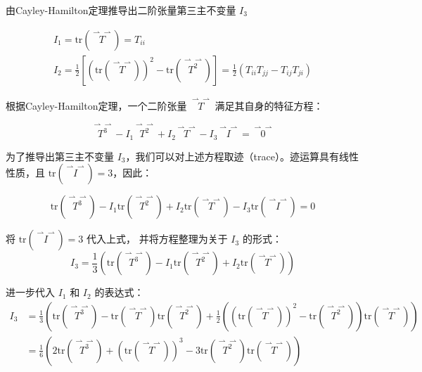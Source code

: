 \documentclass[12pt, a4paper, oneside, UTF8]{ctexbook}  %
\newcommand{\vvec}{\overset{\rightharpoonup\!\!\!\! \rightharpoonup}}
\begin{document}
\begin{example}
由Cayley-Hamilton定理推导出二阶张量第三主不变量 \(I_3\)
\begin{yzh}
\begin{gather*}  
        I_1 = \text{tr}(\vvec{T}) = T_{ii}\\
        I_2 = \frac{1}{2} \left[ (\text{tr}(\vvec{T}))^2 - \text{tr}(\vvec{T^2}) \right] = \frac{1}{2} \left( T_{ii} T_{jj} - T_{ij} T_{ji} \right)
\end{gather*} 
\end{yzh}
\begin{tui}
根据Cayley-Hamilton定理，一个二阶张量 \(\vvec{T}\) 满足其自身的特征方程：

\[
\vvec{T^3} - I_1 \vvec{T^2} + I_2 \vvec{T} - I_3 \vvec{I} = \vvec{0}
\]

为了推导出第三主不变量 \(I_3\)，我们可以对上述方程取迹（trace）。迹运算具有线性性质，且 \(\text{tr}(\vvec{I}) = 3\)，因此：

\[
\text{tr}(\vvec{T^3}) - I_1 \text{tr}(\vvec{T^2}) + I_2 \text{tr}(\vvec{T}) - I_3 \text{tr}(\vvec{I}) = 0
\]

将 \(\text{tr}(\vvec{I}) = 3\) 代入上式，
并将方程整理为关于 \(I_3\) 的形式：
\[
I_3 = \frac{1}{3} \left( \text{tr}(\vvec{T^3}) - I_1 \text{tr}(\vvec{T^2}) + I_2 \text{tr}(\vvec{T}) \right)
\]

进一步代入 \(I_1\) 和 \(I_2\) 的表达式：
\begin{align*}
I_3 &= \frac{1}{3} \left( \text{tr}(\vvec{T^3}) - \text{tr}(\vvec{T}) \text{tr}(\vvec{T^2}) 
+ \frac{1}{2} \left( (\text{tr}(\vvec{T}))^2 - \text{tr}(\vvec{T^2}) \right) \text{tr}(\vvec{T}) \right)\\
 &= \frac{1}{6}\left(2\text{tr}(\vvec{T^3})+(\text{tr}(\vvec{T}))^3
 -3\text{tr}(\vvec{T^2})\text{tr}(\vvec{T})\right)  
\end{align*}
\end{tui}
\end{example}
\end{document}
